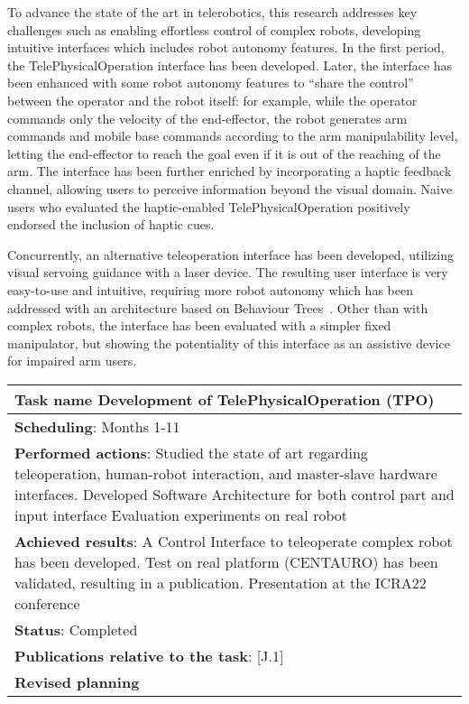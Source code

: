 To advance the state of the art in telerobotics, this research addresses key challenges such as enabling effortless control of complex robots, developing intuitive interfaces which includes robot autonomy features.
In the first period, the TelePhysicalOperation interface has been developed. Later, the interface has been enhanced with some robot autonomy features to \enquote{share the control} between the operator and the robot itself: for example, while the operator commands only the velocity of the end-effector, the robot generates arm commands and mobile base commands according to the arm manipulability level, letting the end-effector to reach the goal even if it is out of the reaching of the arm.
The interface has been further enriched by incorporating a haptic feedback channel, allowing users to perceive information beyond the visual domain. Naive users who evaluated the haptic-enabled TelePhysicalOperation positively endorsed the inclusion of haptic cues.

Concurrently, an alternative teleoperation interface has been developed, utilizing visual servoing guidance with a laser device. The resulting user interface is very easy-to-use and intuitive, requiring more robot autonomy which has been addressed with an architecture based on Behaviour Trees~\cite{Iovino2022}.
Other than with complex robots, the interface has been evaluated with a simpler fixed manipulator, but showing the potentiality of this interface as an assistive device for impaired arm users.
	
\begin{table}[H]
	\begin{center}
		\renewcommand{\arraystretch}{1.3} %
		\setlength{\tabcolsep}{8pt} %
		\begin{tabular}{|P{15cm}|}
			\hline
			\textbf{Task name} Development of TelePhysicalOperation (TPO) \\ \hline
			\textbf{Scheduling}: Months 1-11 \\ \hline
			\textbf{Performed actions}: Studied the state of art regarding teleoperation, human-robot interaction, and master-slave hardware interfaces. 
			Developed Software Architecture for both control part and input interface 
			Evaluation experiments on real robot\\
			\hline
			\textbf{Achieved results}: A Control Interface to teleoperate complex robot has been developed. Test on real platform (CENTAURO) has been validated, resulting in a publication. Presentation at the ICRA22 conference \\
			\hline
			\textbf{Status}: Completed\\
			\hline
			\textbf{Publications relative to the task}: [J.1]\\
			\hline
			\textbf{Revised planning}\\
			\hline
		\end{tabular}
	\end{center}
\end{table}

